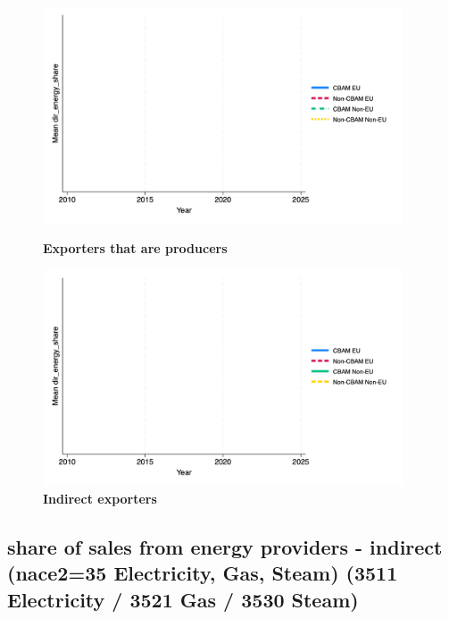 \documentclass{article}
\begin{document}
\begin{figure}[H]
\centering
\includegraphics[width=0.95\textwidth]{dir_energy_share_ep.png}
\caption{\textbf{Exporters that are producers}}
\includegraphics[width=0.95\textwidth]{dir_energy_share_indir.png}
\caption{\textbf{Indirect exporters}}
\end{figure}

\subsection{share of sales from energy providers - indirect (nace2=35 Electricity, Gas, Steam)  (3511 Electricity / 3521 Gas / 3530 Steam)}
\end{document}
